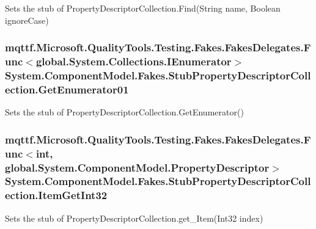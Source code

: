 Sets the stub of Property\-Descriptor\-Collection.\-Find(\-String name, Boolean ignore\-Case)

\hypertarget{class_system_1_1_component_model_1_1_fakes_1_1_stub_property_descriptor_collection_a4f7bf8314a7bd1fefdd659bb02db1954}{
\subsubsection[{Get\-Enumerator01}]{\setlength{\rightskip}{0pt plus 5cm}mqttf.\-Microsoft.\-Quality\-Tools.\-Testing.\-Fakes.\-Fakes\-Delegates.\-Func$<$global.\-System.\-Collections.\-I\-Enumerator$>$ System.\-Component\-Model.\-Fakes.\-Stub\-Property\-Descriptor\-Collection.\-Get\-Enumerator01}}\label{class_system_1_1_component_model_1_1_fakes_1_1_stub_property_descriptor_collection_a4f7bf8314a7bd1fefdd659bb02db1954}


Sets the stub of Property\-Descriptor\-Collection.\-Get\-Enumerator()

\hypertarget{class_system_1_1_component_model_1_1_fakes_1_1_stub_property_descriptor_collection_a7fce199636d88712bef82ae7a1684d21}{
\subsubsection[{Item\-Get\-Int32}]{\setlength{\rightskip}{0pt plus 5cm}mqttf.\-Microsoft.\-Quality\-Tools.\-Testing.\-Fakes.\-Fakes\-Delegates.\-Func$<$int, global.\-System.\-Component\-Model.\-Property\-Descriptor$>$ System.\-Component\-Model.\-Fakes.\-Stub\-Property\-Descriptor\-Collection.\-Item\-Get\-Int32}}\label{class_system_1_1_component_model_1_1_fakes_1_1_stub_property_descriptor_collection_a7fce199636d88712bef82ae7a1684d21}


Sets the stub of Property\-Descriptor\-Collection.\-get\-\_\-\-Item(\-Int32 index)

